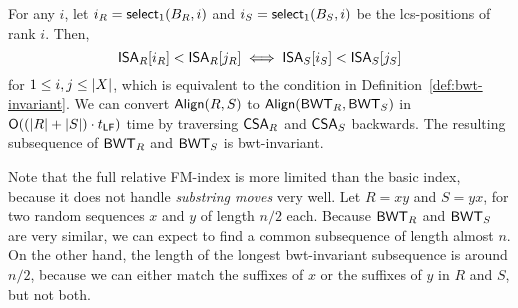 For any $i$, let $i_{R} = \mathsf{select}_{1}(B_{R}, i)$ and $i_{S} =
\mathsf{select}_{1}(B_{S}, i)$ be the lcs-positions of rank $i$. Then,
$$
\mathsf{ISA}_{R}[i_{R}] < \mathsf{ISA}_{R}[j_{R}] \iff \mathsf{ISA}_{S}[i_{S}] < \mathsf{ISA}_{S}[j_{S}]
$$
for $1 \le i,j \le \lvert X \rvert$, which is equivalent to the condition in
Definition~\ref{def:bwt-invariant}. We can convert $\mathsf{Align}(R,S)$ to
$\mathsf{Align}(\mathsf{BWT}_{R},\mathsf{BWT}_{S})$ in $\mathsf{O}((\lvert R \rvert+\lvert S \rvert) \cdot t_{\mathsf{LF}})$ time by
traversing $\mathsf{CSA}_{R}$ and $\mathsf{CSA}_{S}$ backwards. The resulting subsequence of
$\mathsf{BWT}_{R}$ and $\mathsf{BWT}_{S}$ is bwt-invariant.

Note that the full relative FM-index is more limited than the basic index,
because it does not handle \emph{substring moves} very well. Let $R = xy$ and
$S = yx$, for two random sequences $x$ and $y$ of length $n/2$ each. Because
$\mathsf{BWT}_{R}$ and $\mathsf{BWT}_{S}$ are very similar, we can expect to find a common
subsequence of length almost $n$. On the other hand, the length of the longest
bwt-invariant subsequence is around $n/2$, because we can either match the
suffixes of $x$ or the suffixes of $y$ in $R$ and $S$, but not both.

